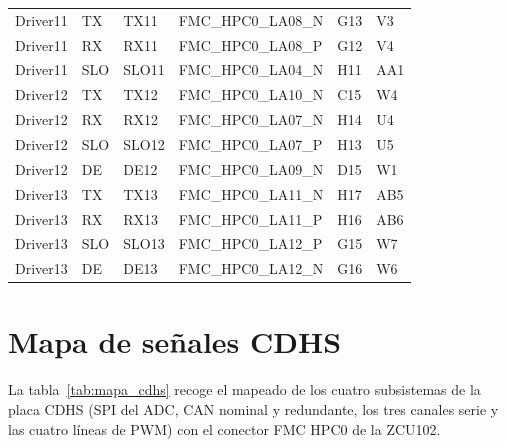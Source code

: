 {\begin{longtable}{llllll}
    Driver11 & TX  & TX11  & FMC\_HPC0\_LA08\_N     & G13 & V3   \\
    Driver11 & RX  & RX11  & FMC\_HPC0\_LA08\_P     & G12 & V4   \\
    Driver11 & SLO & SLO11 & FMC\_HPC0\_LA04\_N     & H11 & AA1  \\
    Driver12 & TX  & TX12  & FMC\_HPC0\_LA10\_N     & C15 & W4   \\
    Driver12 & RX  & RX12  & FMC\_HPC0\_LA07\_N     & H14 & U4   \\
    Driver12 & SLO & SLO12 & FMC\_HPC0\_LA07\_P     & H13 & U5   \\
    Driver12 & DE  & DE12  & FMC\_HPC0\_LA09\_N     & D15 & W1   \\
    Driver13 & TX  & TX13  & FMC\_HPC0\_LA11\_N     & H17 & AB5  \\
    Driver13 & RX  & RX13  & FMC\_HPC0\_LA11\_P     & H16 & AB6  \\
    Driver13 & SLO & SLO13 & FMC\_HPC0\_LA12\_P     & G15 & W7   \\
    Driver13 & DE  & DE13  & FMC\_HPC0\_LA12\_N     & G16 & W6   \\
\end{longtable}
}

\section{Mapa de señales CDHS} \label{anxC:mapa_cdhs}

La tabla~\ref{tab:mapa_cdhs} recoge el mapeado de los cuatro subsistemas de la placa CDHS (SPI del
ADC, CAN nominal y redundante, los tres canales serie y las cuatro líneas de PWM) con el conector
FMC HPC0 de la ZCU102.

